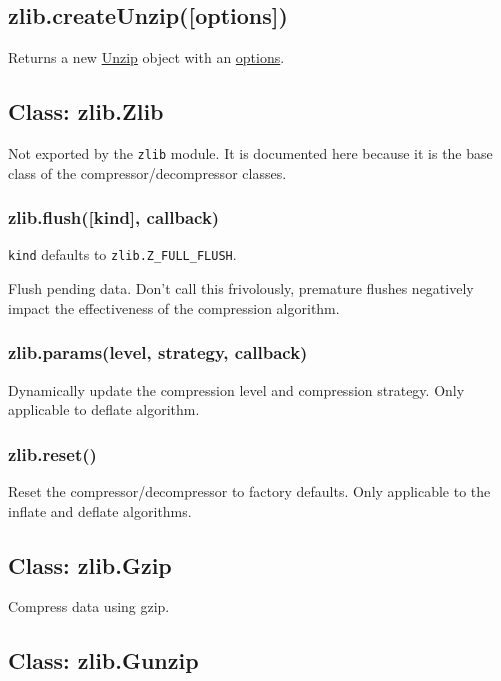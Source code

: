 \subsection{zlib.createUnzip({[}options{]})}\label{zlib.createunzipoptions}

Returns a new \hyperref[zlibux5fclassux5fzlibux5funzip]{Unzip} object
with an \hyperref[zlibux5foptions]{options}.

\subsection{Class: zlib.Zlib}\label{class-zlib.zlib}

Not exported by the \texttt{zlib} module. It is documented here because
it is the base class of the compressor/decompressor classes.

\subsubsection{zlib.flush({[}kind{]},
callback)}\label{zlib.flushkind-callback}

\texttt{kind} defaults to \texttt{zlib.Z\_FULL\_FLUSH}.

Flush pending data. Don't call this frivolously, premature flushes
negatively impact the effectiveness of the compression algorithm.

\subsubsection{zlib.params(level, strategy,
callback)}\label{zlib.paramslevel-strategy-callback}

Dynamically update the compression level and compression strategy. Only
applicable to deflate algorithm.

\subsubsection{zlib.reset()}\label{zlib.reset}

Reset the compressor/decompressor to factory defaults. Only applicable
to the inflate and deflate algorithms.

\subsection{Class: zlib.Gzip}\label{class-zlib.gzip}

Compress data using gzip.

\subsection{Class: zlib.Gunzip}\label{class-zlib.gunzip}

